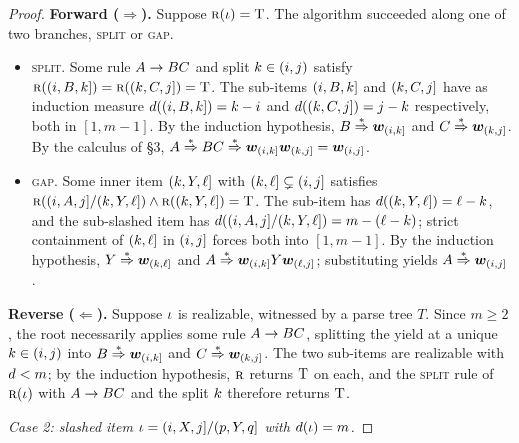 \documentclass{article}
\begin{document}
\begin{proof}
    \textbf{Forward ($\Rightarrow$).} Suppose ${\textsc{r}}({{ \iota}}) = {\mathbin{\mathrm{T}}}$. The algorithm succeeded along one of two branches, \textsc{split} or \textsc{gap}.
    \begin{itemize}[noitemsep,topsep=0pt,leftmargin=15pt,parsep=0pt,partopsep=0pt]
        \item \textsc{split.} Some rule ${{ A \rightarrow BC}}$ and split ${{ k}} \in ({{ i}}, {{ j}})$ satisfy ${\textsc{r}}(({{ i}}, B, {{ k}}]) = {\textsc{r}}(({{ k}}, C, {{ j}}]) = {\mathbin{\mathrm{T}}}$. 
        The sub-items $({{ i}}, B, {{ k}}]$ and $({{ k}}, C, {{ j}}]$ have as induction measure ${d}(({{ i}}, B, {{ k}}])={{ k}} - {{ i}}$ and ${d}(({{ k}}, C, {{ j}}])={{ j}} - {{ k}}$ respectively, both in $[1, m{-}1]$. 
        By the induction hypothesis, $B \mathrel{{\overset{*}{\Rightarrow}}} {{\boldsymbol{w}}}_{({{ i}}, {{ k}}]}$ and $C \mathrel{{\overset{*}{\Rightarrow}}} {{\boldsymbol{w}}}_{({{ k}}, {{ j}}]}$. By the calculus of §3, $A \mathrel{{\overset{*}{\Rightarrow}}} BC \mathrel{{\overset{*}{\Rightarrow}}} {{\boldsymbol{w}}}_{({{ i}}, {{ k}}]} {{\boldsymbol{w}}}_{({{ k}}, {{ j}}]} = {{\boldsymbol{w}}}_{({{ i}}, {{ j}}]}$.
        \item \textsc{gap.} Some inner item $({{ k}}, Y, {{\ell}}]$ with $({{ k}},{{\ell}}] \subsetneq ({{ i}},{{ j}}]$ satisfies ${\textsc{r}}(({{ i}}, A, {{ j}}] / ({{ k}}, Y, {{\ell}}]) \land {\textsc{r}}(({{ k}}, Y, {{\ell}}]) = {\mathbin{\mathrm{T}}}$. 
        The sub-item has ${d}(({{ k}}, Y, {{\ell}}]) = {{\ell}} - {{ k}}$, and the sub-slashed item has ${d}(({{ i}}, A, {{ j}}] / ({{ k}}, Y, {{\ell}}]) = m - ({{\ell}} - {{ k}})$; strict containment of $({{ k}}, {{\ell}}]$ in $({{ i}}, {{ j}}]$ forces both into $[1, m{-}1]$. 
        By the induction hypothesis, $Y \mathrel{{\overset{*}{\Rightarrow}}} {{\boldsymbol{w}}}_{({{ k}}, {{\ell}}]}$ and $A \mathrel{{\overset{*}{\Rightarrow}}} {{\boldsymbol{w}}}_{({{ i}}, {{ k}}]} Y {{\boldsymbol{w}}}_{({{\ell}}, {{ j}}]}$; substituting yields $A \mathrel{{\overset{*}{\Rightarrow}}} {{\boldsymbol{w}}}_{({{ i}}, {{ j}}]}$.
    \end{itemize}
    
    \textbf{Reverse ($\Leftarrow$).} Suppose ${{ \iota}}$ is realizable, witnessed by a parse tree $T$. Since $m \ge 2$, the root necessarily applies some rule ${{ A \rightarrow BC}}$, splitting the yield at a unique ${{ k}} \in ({{ i}}, {{ j}})$ into $B \mathrel{{\overset{*}{\Rightarrow}}} {{\boldsymbol{w}}}_{({{ i}}, {{ k}}]}$ and $C \mathrel{{\overset{*}{\Rightarrow}}} {{\boldsymbol{w}}}_{({{ k}}, {{ j}}]}$. The two sub-items are realizable with ${d} < m$; by the induction hypothesis, ${\textsc{r}}$ returns ${\mathbin{\mathrm{T}}}$ on each, and the \textsc{split} rule of ${\textsc{r}}({{ \iota}})$ with ${{ A \rightarrow BC}}$ and the split ${{ k}}$ therefore returns ${\mathbin{\mathrm{T}}}$.
    
    \emph{Case 2: slashed item ${{ \iota}} = ({{ i}}, X, {{ j}}] / (p, Y, q]$ with ${d}({{ \iota}}) = m$.}
    

\end{proof}
\end{document}
